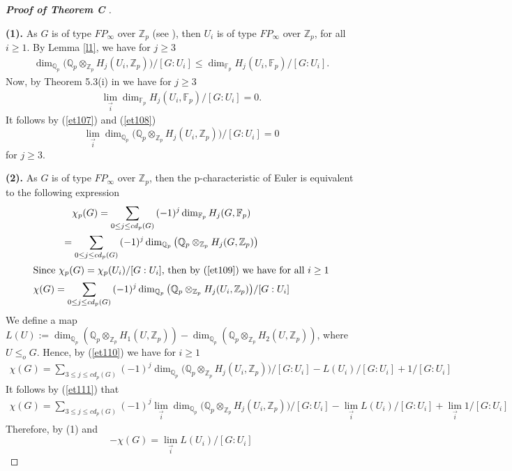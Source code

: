 \documentclass[10pt]{amsart}
\theoremstyle{plain}
\theoremstyle{definition}
\theoremstyle{remark}
\numberwithin{prop}{section}
\numberwithin{example}{section}
\numberwithin{equation}{section}
\newcommand{\Z}{\mathbb{Z}}
\newcommand{\Q}{\mathbb{Q}}
\newcommand{\F}{\mathbb{F}}
\begin{document}
	\begin{proof}[\textbf{Proof of Theorem C} ]
 \noindent
				\\ \item[\textbf{(1).}] As  $G$ is of  type  $FP_\infty$ over $\Z_p$ (see  \cite[\S 4, Cor. 4.4]{AC}), then     $U_i$ is of type  $FP_\infty$ over $\Z_p$,  for all $i\geq 1$. By Lemma \ref{l1}, we have for $j\geq 3$
			\begin{align}\label{et107}	
				\dim_{\Q_p}(\Q_p\otimes_{\Z_p}H_{j}(U_i,\Z_p)\big)/[G:U_i]\leq \dim_{\F_p}H_j(U_i,\F_p)/[G:U_i]. 
			\end{align}
			Now, by Theorem  5.3(i) in \cite{AC}  we have for $j\geq 3$
			\begin{align}\label{et108}
				\displaystyle\lim_{\overrightarrow{i}}{\dim_{\F_p}H_j(U_i,\F_p)/[G:U_i]} =0.
			\end{align}
			It follows  by (\ref{et107}) and (\ref{et108})
			$$\displaystyle\lim_{\overrightarrow{i}}{\dim_{\Q_p}(\Q_p\otimes_{\Z_p}H_{j}(U_i,\Z_p)\big)/[G:U_i]} =0$$ for  $j\geq 3$.
			
			\item[\textbf{(2).}] As $G$ is of type $FP_{\infty}$ over $\Z_p$, then  the p-characteristic of Euler is equivalent to the following expression 
			\begin{gather}
				\nonumber\chi_p(G)=\displaystyle\sum_{0\leq j\leq cd_p(G)}{(-1)^j \dim_{\F_p}{H_j(G,\F_p)}}\\\label{et109}=
				\displaystyle\sum_{0\leq j\leq cd_p(G)}{(-1)^j \dim_{\Q_p}{\big(\Q_p\otimes_{\Z_p}H_j(G,\Z_p)\big)}}
				\\\intertext{Since   $\chi_p(G)=\chi_p(U_i)/[G:U_i]$,  then by (\ref{et109})  we have  for all  $i\geq 1$}
				\label{et110}\chi(G)=\displaystyle\sum_{0\leq j\leq cd_p(G)}{(-1)^j \dim_{\Q_p}{\big(\Q_p\otimes_{\Z_p}H_j(U_i,\Z_p)\big)/[G:U_i]}}
			\end{gather}
			We define  a map   $L(U):=\dim_{\Q_p}{(\Q_p\otimes_{\Z_p}H_1(U,\Z_p))}-\dim_{\Q_p} (\Q_p\otimes_{\Z_p}H_2(U,\Z_p))$,  where $U\displaystyle\leq_o{G}$. Hence, by (\ref{et110}) we have for $i\geq 1$  
			\begin{align}\label{et111}	
				\chi(G)=\displaystyle\sum_{3\leq j\leq cd_p(G)}{(-1)^j \dim_{\Q_p}{\big(\Q_p\otimes_{\Z_p}H_j(U_i,\Z_p)\big)/[G:U_i]}}-L(U_i)/[G:U_i]+1/[G:U_i]
			\end{align} 
			It follows by (\ref{et111}) that  
			\begin{align}\label{et112}	
				\chi(G)=\displaystyle\sum_{3\leq j\leq cd_p(G)}{(-1)^j \displaystyle\lim_{\overrightarrow{i}}\dim_{\Q_p}{\big(\Q_p\otimes_{\Z_p}H_j(U_i,\Z_p)\big)/[G:U_i]}}-\displaystyle\lim_{\overrightarrow{i}}L(U_i)/[G:U_i]+\displaystyle\lim_{\overrightarrow{i}}1/[G:U_i]
			\end{align} 
			Therefore, by (1)  and
			$$-\chi(G)=\displaystyle\lim_{\overrightarrow{i}}{L(U_i)/[G:U_i]}$$
			

\end{proof}
\end{document}
